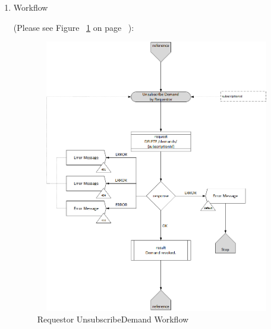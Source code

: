\begin{enumerate}
\item Workflow

(Please see Figure ~\ref{fig:UsD} on page ~\pageref{fig:UsD}):

\begin{figure}[htbp]
    \centering
    \includegraphics[width=12cm,height=12cm,angle=0]{./diag/Workflow/Market/UnsubsribeDemand-R-Workflow.png}
    \caption{Requestor UnsubscribeDemand Workflow}
	\label{fig:UsD}
\end{figure}

\end{enumerate}

\newpage


